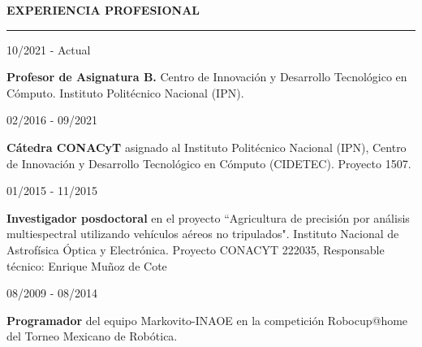 \documentclass[10pt]{article}
\begin{document}
{\bf EXPERIENCIA PROFESIONAL}
\vspace{3pt}
\hrule

\begin{minipage}{1.5 in}
	10/2021 - Actual\\
\end{minipage}
\begin{minipage}{4.5in}
	\textbf{Profesor de Asignatura B.} Centro de Innovación y Desarrollo Tecnológico en Cómputo. Instituto Politécnico Nacional (IPN).\\ 
\end{minipage}

\begin{minipage}{1.5 in}
	02/2016 - 09/2021\\
\end{minipage}
\begin{minipage}{4.5in}
	\textbf{Cátedra CONACyT} asignado al Instituto Politécnico Nacional (IPN), Centro de Innovación y Desarrollo Tecnológico en Cómputo (CIDETEC). Proyecto 1507.\\ 
\end{minipage}


\begin{minipage}{1.5 in}
	01/2015 - 11/2015\\
\end{minipage}
\begin{minipage}{4.5in}
	\textbf{Investigador posdoctoral} en el proyecto ``Agricultura de precisión por análisis multiespectral
	utilizando vehículos aéreos no tripulados". Instituto Nacional de Astrofísica Óptica y Electrónica. Proyecto CONACYT 222035, Responsable técnico: Enrique Muñoz de Cote\\ 
\end{minipage}

\begin{minipage}{1.5 in}
08/2009 - 08/2014\\
\end{minipage}
\begin{minipage}{4.5in}
\textbf{Programador} del equipo Markovito-INAOE en la competición Robocup@home del Torneo Mexicano de Robótica.\\ 
\end{minipage}
\end{document}
